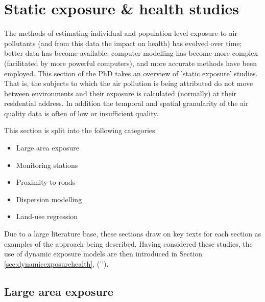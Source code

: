 
\newpage

\section{Static exposure \& health studies}
\label{sec:staticexposurehealth}

The methods of estimating individual and population level exposure to air pollutants (and from this data the impact on health) has evolved over time; better data has become available, computer modelling has become more complex (facilitated by more powerful computers), and more accurate methods have been employed. This section of the PhD takes an overview of 'static exposure' studies. That is, the subjects to which the air pollution is being attributed do not move between environments and their exposure is calculated (normally) at their residential address. In addition the temporal and spatial granularity of the air quality data is often of low or insufficient quality.

This section is split into the following categories:

\begin{itemize}
\item Large area exposure
\item Monitoring stations
\item Proximity to roads
\item Dispersion modelling
\item Land-use regression
\end{itemize}

Due to a large literature base, these sections draw on key texts for each section as examples of the approach being described. Having considered these studies, the use of dynamic exposure models are then introduced in Section \ref{sec:dynamicexposurehealth}, ('').


\subsection{Large area exposure}
\label{subsec:largearea}

